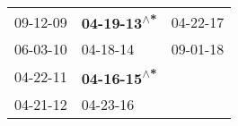 \begin{supertabular}{lll}
 09-12-09\textsuperscript{} &  \textbf{04-19-13\textsuperscript{$\wedge$*}} &  04-22-17\textsuperscript{} \\
 06-03-10\textsuperscript{} &                    04-18-14\textsuperscript{} &  09-01-18\textsuperscript{} \\
 04-22-11\textsuperscript{} &  \textbf{04-16-15\textsuperscript{$\wedge$*}} &                             \\
 04-21-12\textsuperscript{} &                    04-23-16\textsuperscript{} &                             \\
\end{supertabular}
